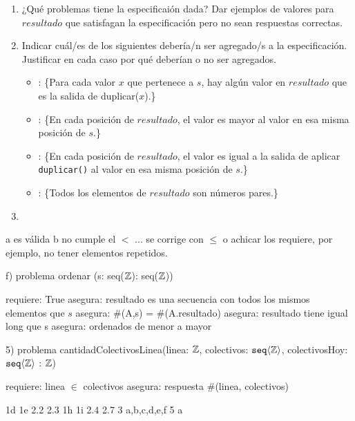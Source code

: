 \documentclass[12pt,a4paper,spanish]{article}
\begin{document}
\begin{enumerate}[label=\alph*)]
	\item  ¿Qué problemas tiene la especificaión dada? Dar ejemplos de valores para $resultado$ que satisfagan la especificación pero no sean respuestas correctas.\\
	      \hacer
	\item  Indicar cuál/es de los siguientes \asegura debería/n ser agregado/s a la especificación. Justificar en cada caso por qué deberían o no ser agregados.
	      \begin{itemize}
		      \item \asegura: \{Para cada valor $x$ que pertenece a $s$, hay algún valor en $resultado$ que es la salida de duplicar($x$).\}
		      \item \asegura: \{En cada posición de $resultado$, el valor es mayor al valor en esa misma posición de $s$.\}
		      \item \asegura: \{En cada posición de $resultado$, el valor es igual a la salida de aplicar \texttt{duplicar()} al valor en esa misma posición de $s$.\}
		      \item \asegura: \{Todos los elementos de $resultado$ son números pares.\}
	      \end{itemize}
	      \hacer
	\item
\end{enumerate}



a es válida
b  no cumple el $<$ ... se corrige con $\leq$ o achicar los requiere, por ejemplo, no tener elementos repetidos.

f) problema ordenar (s: seq($\mathbb Z$): seq($\mathbb Z$))

requiere: {True}
asegura: {resultado es una secuencia con todos los mismos elementos que
$s$}
asegura: {\#(A,s) = \#(A.resultado)}
asegura: {resultado tiene igual long que s }
asegura: {ordenados de menor a mayor}


5)
problema cantidadColectivosLinea(linea: $\mathbb Z$, colectivos: $\texttt{seq} \langle \mathbb Z \rangle$, colectivosHoy: $\texttt{seq} \langle \mathbb Z \rangle$ : $\mathbb Z$){
requiere: {linea $\in$ colectivos}
asegura: {respuesta \#(linea, colectivos)}

}


1d
1e
2.2
2.3
1h
1i
2.4
2.7
3 a,b,c,d,e,f
5 a
\end{document}

